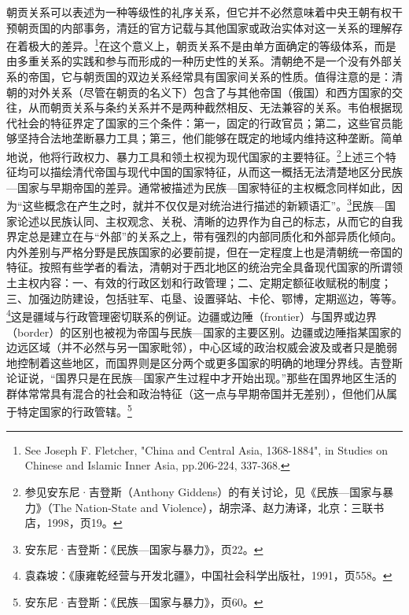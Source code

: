 \documentclass[a4paper, 12pt, openright]{ctexbook}
\begin{document}
朝贡关系可以表述为一种等级性的礼序关系，但它并不必然意味着中央王朝有权干预朝贡国的内部事务，清廷的官方记载与其他国家或政治实体对这一关系的理解存在着极大的差异。\footnote{See Joseph F. Fletcher, "China and Central Asia, 1368-1884", in Studies on Chinese and Islamic Inner Asia, pp.206-224, 337-368.}在这个意义上，朝贡关系不是由单方面确定的等级体系，而是由多重关系的实践和参与而形成的一种历史性的关系。清朝绝不是一个没有外部关系的帝国，它与朝贡国的双边关系经常具有国家间关系的性质。值得注意的是：清朝的对外关系（尽管在朝贡的名义下）包含了与其他帝国（俄国）和西方国家的交往，从而朝贡关系与条约关系并不是两种截然相反、无法兼容的关系。韦伯根据现代社会的特征界定了国家的三个条件：第一，固定的行政官员；第二，这些官员能够坚持合法地垄断暴力工具；第三，他们能够在既定的地域内维持这种垄断。简单地说，他将行政权力、暴力工具和领土权视为现代国家的主要特征。\footnote{参见安东尼·吉登斯（Anthony Giddens）的有关讨论，见《民族—国家与暴力》（The Nation-State and Violence），胡宗泽、赵力涛译，北京：三联书店，1998，页19。}上述三个特征均可以描绘清代帝国与现代中国的国家特征，从而这一概括无法清楚地区分民族—国家与早期帝国的差异。通常被描述为民族—国家特征的主权概念同样如此，因为“这些概念在产生之时，就并不仅仅是对统治进行描述的新颖语汇”。\footnote{安东尼·吉登斯：《民族—国家与暴力》，页22。}民族—国家论述以民族认同、主权观念、关税、清晰的边界作为自己的标志，从而它的自我界定总是建立在与“外部”的关系之上，带有强烈的内部同质化和外部异质化倾向。内外差别与严格分野是民族国家的必要前提，但在一定程度上也是清朝统一帝国的特征。按照有些学者的看法，清朝对于西北地区的统治完全具备现代国家的所谓领土主权内容：一、有效的行政区划和行政管理；二、定期定额征收赋税的制度；三、加强边防建设，包括驻军、屯垦、设置驿站、卡伦、鄂博，定期巡边，等等。\footnote{袁森坡：《康雍乾经营与开发北疆》，中国社会科学出版社，1991，页558。}这是疆域与行政管理密切联系的例证。边疆或边陲（frontier）与国界或边界（border）的区别也被视为帝国与民族—国家的主要区别。边疆或边陲指某国家的边远区域（并不必然与另一国家毗邻），中心区域的政治权威会波及或者只是脆弱地控制着这些地区，而国界则是区分两个或更多国家的明确的地理分界线。吉登斯论证说，“国界只是在民族—国家产生过程中才开始出现。”那些在国界地区生活的群体常常具有混合的社会和政治特征（这一点与早期帝国并无差别），但他们从属于特定国家的行政管辖。\footnote{安东尼·吉登斯：《民族—国家与暴力》，页60。}
\end{document}
